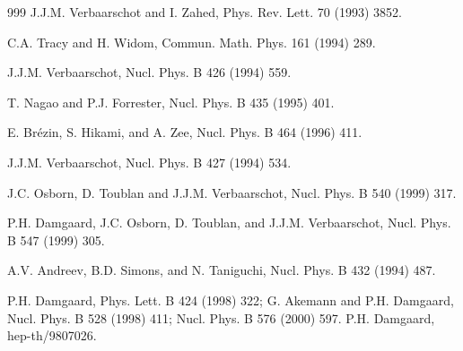 \begin{thebibliography}{999}
      J.J.M. Verbaarschot and I. Zahed,
                      Phys. Rev. Lett. 70 (1993) 3852.      %

       C.A. Tracy and H. Widom, 
                      Commun. Math. Phys. 161 (1994) 289.     %

      J.J.M. Verbaarschot, 
                      Nucl. Phys. B 426 (1994) 559.         %

      T. Nagao and P.J. Forrester, 
                      Nucl. Phys. B 435 (1995) 401.         %

      E. Br\'ezin, S. Hikami, and A. Zee, 
                      Nucl. Phys. B 464 (1996) 411.         %

     J.J.M. Verbaarschot, 
                      Nucl. Phys. B 427 (1994) 534.         %

         J.C. Osborn, D. Toublan and J.J.M. Verbaarschot, 
                      Nucl. Phys. B 540 (1999) 317.         %

      P.H. Damgaard, J.C. Osborn, D. Toublan, and
                      J.J.M. Verbaarschot, 
                      Nucl. Phys. B 547 (1999) 305.      %

     A.V. Andreev, B.D. Simons, and N. Taniguchi, 
                      Nucl. Phys. B 432 (1994) 487.

     P.H. Damgaard, 
                      Phys. Lett. B 424 (1998) 322;      %
                      G. Akemann and P.H. Damgaard, 
                      Nucl. Phys. B 528 (1998) 411;      %
                      Nucl. Phys. B 576 (2000) 597.
                      P.H. Damgaard,
                      hep-th/9807026.                    %


\end{thebibliography}
